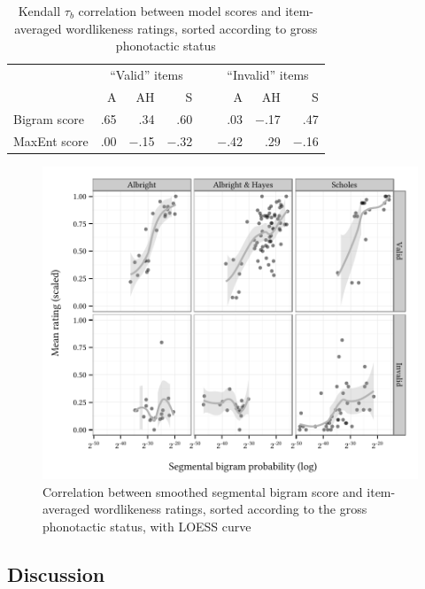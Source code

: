\begin{table}[t]
\centering
\begin{tabular}{l rrr c rrr}
\toprule                
             & \multicolumn{3}{c}{``Valid'' items} && \multicolumn{3}{c}{``Invalid'' items} \\
\cmidrule{2-4} \cmidrule{6-8}
             &         A &       AH &        S &&     A  &       AH &          S \\
\midrule
Bigram score &     {.65} &    {.34} &    {.60} &&    {.03} & {$-$.17} &    {.47} \\
MaxEnt score &     {.00} & {$-$.15} & {$-$.32} && {$-$.42} &    {.29} & {$-$.16} \\
\bottomrule
\end{tabular}
\caption{Kendall $\tau_{b}$ correlation between model scores and item-averaged wordlikeness ratings, sorted according to gross phonotactic status}
\label{resid}
\end{table}

\begin{figure}[t]
\centering
\includegraphics{bigramresid.pdf}
\caption{Correlation between smoothed segmental bigram score and item-averaged wordlikeness ratings, sorted according to the gross phonotactic status, with LOESS curve}
\label{bigramresid}
\end{figure}

\subsection{Discussion}

